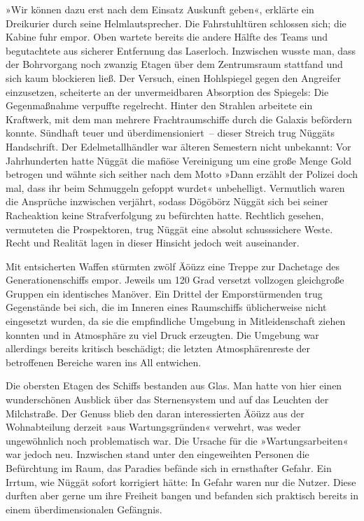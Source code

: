 »Wir können dazu erst nach dem Einsatz Auskunft geben«, erklärte ein Dreikurier durch seine Helmlautsprecher. Die Fahrstuhltüren schlossen sich; die Kabine fuhr empor. Oben wartete bereits die andere Hälfte des Teams und begutachtete aus sicherer Entfernung das Laserloch. Inzwischen wusste man, dass der Bohrvorgang noch zwanzig Etagen über dem Zentrumsraum stattfand und sich kaum blockieren ließ. Der Versuch, einen Hohlspiegel gegen den Angreifer einzusetzen, scheiterte an der unvermeidbaren Absorption des Spiegels: Die Gegenmaßnahme verpuffte regelrecht. Hinter den Strahlen arbeitete ein Kraftwerk, mit dem man mehrere Frachtraumschiffe durch die Galaxis befördern konnte. Sündhaft teuer und überdimensioniert~– dieser Streich trug Nüggäts Handschrift. Der Edelmetallhändler war älteren Semestern nicht unbekannt: Vor Jahrhunderten hatte Nüggät die mafiöse Vereinigung um eine große Menge Gold betrogen und wähnte sich seither nach dem Motto »Dann erzählt der Polizei doch mal, dass ihr beim Schmuggeln gefoppt wurdet« unbehelligt. Vermutlich waren die Ansprüche inzwischen verjährt, sodass Dögöbörz Nüggät sich bei seiner Racheaktion keine Strafverfolgung zu befürchten hatte. Rechtlich gesehen, vermuteten die Prospektoren, trug Nüggät eine absolut schusssichere Weste. Recht und Realität lagen in dieser Hinsicht jedoch weit auseinander.

Mit entsicherten Waffen stürmten zwölf Äöüzz eine Treppe zur Dachetage des Generationenschiffs empor. Jeweils um 120 Grad versetzt vollzogen gleichgroße Gruppen ein identisches Manöver. Ein Drittel der Emporstürmenden trug Gegenstände bei sich, die im Inneren eines Raumschiffs üblicherweise nicht eingesetzt wurden, da sie die empfindliche Umgebung in Mitleidenschaft ziehen konnten und in Atmosphäre zu viel Druck erzeugten. Die Umgebung war allerdings bereits kritisch beschädigt; die letzten Atmosphärenreste der betroffenen Bereiche waren ins All entwichen.

Die obersten Etagen des Schiffs bestanden aus Glas. Man hatte von hier einen wunderschönen Ausblick über das Sternensystem und auf das Leuchten der Milchstraße. Der Genuss blieb den daran interessierten Äöüzz aus der Wohnabteilung derzeit »aus Wartungsgründen« verwehrt, was weder ungewöhnlich noch problematisch war. Die Ursache für die »Wartungsarbeiten« war jedoch neu. Inzwischen stand unter den eingeweihten Personen die Befürchtung im Raum, das Paradies befände sich in ernsthafter Gefahr. Ein Irrtum, wie Nüggät sofort korrigiert hätte: In Gefahr waren nur die Nutzer. Diese durften aber gerne um ihre Freiheit bangen und befanden sich praktisch bereits in einem überdimensionalen Gefängnis.

